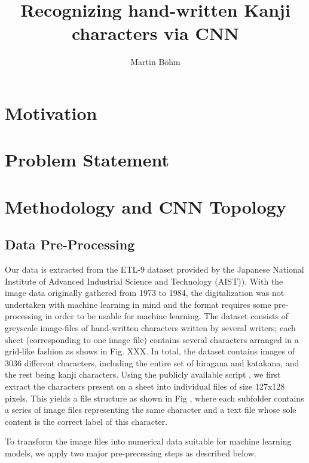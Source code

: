 \documentclass[british,12p]{article}
\title{Recognizing hand-written Kanji characters via CNN}
\author{
        Martin Böhm
        }
\begin{document}
	\maketitle
    \begin{abstract}

           

    \end{abstract}
        
    \section{Motivation}
    
    \section{Problem Statement}
    \section{Methodology and CNN Topology}
    \subsection{Data Pre-Processing}
    Our data is extracted from the ETL-9 dataset provided by the Japanese National Institute of Advanced Industrial Science and Technology (AIST)). With the image data originally gathered from 1973 to 1984, the digitalization was not undertaken with machine learning in mind and the format requires some pre-processing in order to be usable for machine learning. The dataset consists of greyscale image-files of hand-written characters written by several writers; each sheet (corresponding to one image file) contains several characters arranged in a grid-like fashion as shows in Fig. XXX. In total, the dataset contains  images of 3036 different characters, including the entire set of hiragana and katakana, and the rest being kanji characters. 
    	Using the publicly available script , we first extract the characters present on a sheet into individual files of size 127x128 pixels. This yields a file structure as shown in Fig , where each subfolder contains a series of image files representing the same character and a text file whose sole content is the correct label of this character.
    	
    	To transform the image files into numerical data suitable for machine learning models, we apply two major pre-precessing steps as described below.\\
    	
\end{document}

